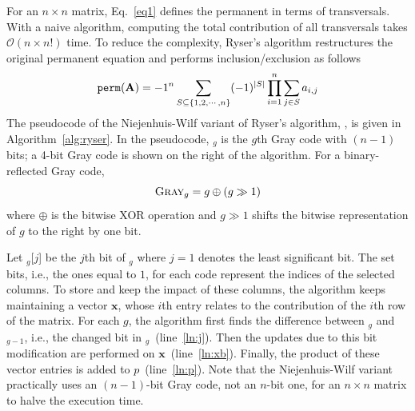 \documentclass{elektr}
\newcommand{\Ab}{\mathbf{A}}
\newcommand{\xb}{\mathbf{x}}
\begin{document}
For an $n \times n$ matrix, Eq.~\ref{eq1} defines the permanent in terms of transversals. With a naive algorithm, computing the total contribution of all transversals takes $\mathcal{O}(n \times n!)$ time. To reduce the complexity, Ryser's algorithm restructures the original permanent equation and performs inclusion/exclusion as follows
\begin{equation}
{\tt perm}(\Ab) = -1^n  \sum_{S \subseteq \{1,2, \cdots, n\}} (-1)^{|S|} \prod_{i=1}^{n} \sum_{j \in S}{a_{i,j}} \label{eq2}
\end{equation}
The pseudocode of the Niejenhuis-Wilf variant of Ryser's algorithm, {}, is given in Algorithm~\ref{alg:ryser}. In the pseudocode, {}$_{g}$ is the $g$th Gray code with $(n-1)$ bits; a 4-bit Gray code is shown on the right of the algorithm. For a binary-reflected Gray code, $$\mbox{\sc{Gray}}_{g} = g \oplus (g \gg 1)$$ where $\oplus$ is the bitwise XOR operation and $g \gg 1$ shifts the bitwise representation of $g$ to the right by one bit.  

Let {}$_{g}$[$j$] be the $j$th bit of  {}$_{g}$ where $j = 1$ denotes the least significant bit. The set bits, i.e., the ones equal to $1$, for each code represent the indices of the selected columns. To store and keep the impact of these columns, the algorithm keeps maintaining a vector $\xb$, whose $i$th entry relates to the contribution of the $i$th row of the matrix. For each $g$, the algorithm first finds the difference between {}$_{g}$ and {}$_{g-1}$, i.e., the changed bit in {}$_{g}$~(line~\ref{ln:j}). Then the updates due to this bit modification are performed on $\xb$~(line~\ref{ln:xb}). Finally, the product of these vector entries is added to $p$~(line~\ref{ln:p}). Note that the Niejenhuis-Wilf variant practically uses an $(n-1)$-bit Gray code, not an $n$-bit one, for an $n \times n$ matrix to halve the execution time. 
\end{document}
